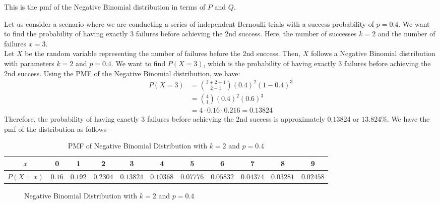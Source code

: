 \documentclass[openany]{book}
\begin{document}
This is the pmf of the Negative Binomial distribution in terms of $P$ and $Q$. \\
\begin{example}
    Let us consider a scenario where we are conducting a series of independent Bernoulli trials with a success probability of $p = 0.4$. We want to find the probability of having exactly 3 failures before achieving the 2nd success. Here, the number of successes $k = 2$ and the number of failures $x = 3$. \\
    Let $X$ be the random variable representing the number of failures before the 2nd success. Then, $X$ follows a Negative Binomial distribution with parameters $k = 2$ and $p = 0.4$. We want to find $P(X = 3)$, which is the probability of having exactly 3 failures before achieving the 2nd success. Using the PMF of the Negative Binomial distribution, we have:
    \begin{align*}
        P(X = 3) &= \binom{3+2-1}{2-1} (0.4)^2 (1-0.4)^3 \\
        &= \binom{4}{1} (0.4)^2 (0.6)^3 \\
        &= 4 \cdot 0.16 \cdot 0.216 = 0.13824
    \end{align*}
    Therefore, the probability of having exactly 3 failures before achieving the 2nd success is approximately $0.13824$ or $13.824\%$.
    We have the pmf of the distribution as follows -
    \begin{table}[H]
        \centering
        \begin{tabular}{c|cccccccccc}
            $x$ & 0 & 1 & 2 & 3 & 4 & 5 & 6 & 7 & 8 & 9 \\
            \hline
            $P(X = x)$ & $0.16$ & $0.192$ & $0.2304$ & $0.13824$ & $0.10368$ & $0.07776$ & $0.05832$ & $0.04374$ & $0.03281$ & $0.02458$ \\
        \end{tabular}
        \caption{PMF of Negative Binomial Distribution with $k = 2$ and $p = 0.4$}
    \end{table}
    \begin{figure}[H]
        \centering
        \caption{Negative Binomial Distribution with $k = 2$ and $p = 0.4$}
    \end{figure}
\end{example}
\end{document}
